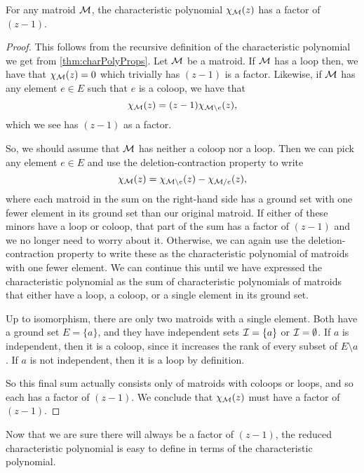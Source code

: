 \documentclass[12pt,oneside]{../../sfsuthesis}
\begin{document}
\begin{proposition}\th\label{thm:charPolyFactor}
    For any matroid \( \mathcal{M} \), the characteristic polynomial \( \chi_{\mathcal{M}}(z) \) has a factor of \( (z - 1) \).
\end{proposition}
\begin{proof}
    This follows from the recursive definition of the characteristic polynomial we get from \th\ref{thm:charPolyProps}.
    Let \( \mathcal{M} \) be a matroid.
    If \( \mathcal{M} \) has a loop then, we have that \( \chi_{\mathcal{M}}(z) = 0 \) which trivially has \( (z - 1) \) is a factor.
    Likewise, if \( \mathcal{M} \) has any element \( e \in E \) such that \( e \) is a coloop, we have that
    \[
        \chi_{\mathcal{M}}(z) = (z - 1)\chi_{\mathcal{M} \setminus e}(z),
    \]
    which we see has \( (z - 1) \) as a factor.

    So, we should assume that \( \mathcal{M} \) has neither a coloop nor a loop.
    Then we can pick any element \( e \in E \) and use the deletion-contraction property to write
    \[
        \chi_{\mathcal{M}}(z) = \chi_{\mathcal{M} \setminus e}(z) - \chi_{\mathcal{M} / e}(z),
    \]
    where each matroid in the sum on the right-hand side has a ground set with one fewer element in its ground set than our original matroid.
    If either of these minors have a loop or coloop, that part of the sum has a factor of \( (z - 1) \) and we no longer need to worry about it.
    Otherwise, we can again use the deletion-contraction property to write these as the characteristic polynomial of matroids with one fewer element.
    We can continue this until we have expressed the characteristic polynomial as the sum of characteristic polynomials of matroids that either have a loop, a coloop, or a single element in its ground set.

    Up to isomorphism, there are only two matroids with a single element.
    Both have a ground set \( E = \{a\} \), and they have independent sets \( \mathcal{I} = \{a\} \) or \( \mathcal{I} = \emptyset \).
    If \( a \) is independent, then it is a coloop, since it increases the rank of every subset of \( E \setminus a \).
    If \( a \) is not independent, then it is a loop by definition.

    So this final sum actually consists only of matroids with coloops or loops, and so each has a factor of \( (z - 1) \).
    We conclude that \( \chi_{\mathcal{M}}(z) \) must have a factor of \( (z - 1) \).
\end{proof}
Now that we are sure there will always be a factor of \( (z - 1) \), the reduced characteristic polynomial is easy to define in terms of the characteristic polynomial.
\end{document}
